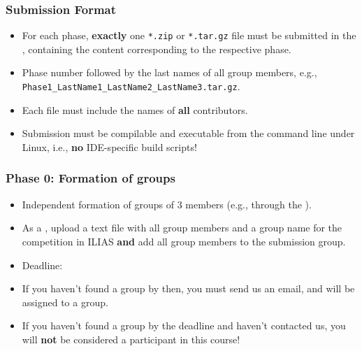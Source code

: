 \begin{frame}[fragile]
  \frametitle{Submission Format}
  \begin{itemize}
    \item For each phase, \textbf{exactly} one \texttt{*.zip} or \texttt{*.tar.gz} file must be submitted in the , containing the content corresponding to the respective phase.
    \item Phase number followed by the last names of all group members, e.g., \texttt{Phase1\_LastName1\_LastName2\_LastName3.tar.gz}.
    \item Each file must include the names of \textbf{all} contributors.
    \item Submission must be compilable and executable from the command line under Linux, i.e., \textbf{no} IDE-specific build scripts!
  \end{itemize}
\end{frame}

\begin{frame}[fragile]
  \frametitle{Phase 0: Formation of groups}
  \begin{itemize}
      \item Independent formation of groups of 3 members (e.g., through the ).
      \item As a , upload a text file with all group members and a group name for the competition in ILIAS \textbf{and} add all group members to the submission group.
      \item Deadline: \textbf{\dateDeadlinePhaseZero}
      \item If you haven't found a group by then, you must send us an email, and will be assigned to a group.
      \item If you haven't found a group by the deadline and haven't contacted us, you will \textbf{not} be considered a participant in this course!
  \end{itemize}
\end{frame}

